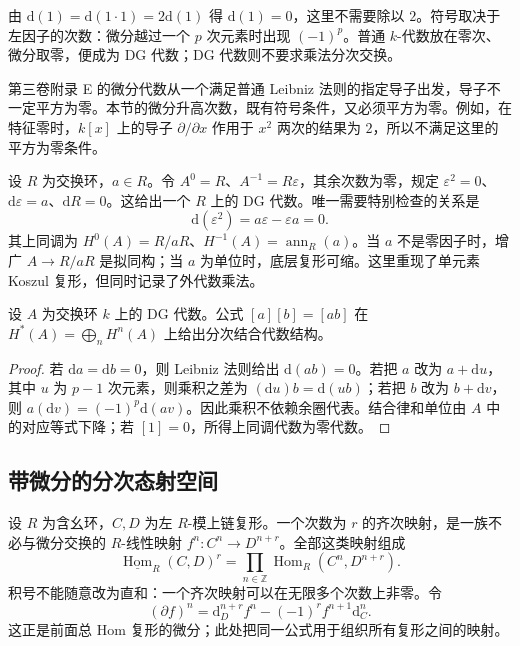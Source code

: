 由 \(\mathrm{d}(1)=\mathrm{d}(1\cdot1)=2\mathrm{d}(1)\) 得 \(\mathrm{d}(1)=0\)，这里不需要除以 \(2\)。符号取决于左因子的次数：微分越过一个 \(p\) 次元素时出现 \((-1)^p\)。普通 \(k\)-代数放在零次、微分取零，便成为 DG 代数；DG 代数则不要求乘法分次交换。

\ProseParagraphBreak
第三卷附录 E 的微分代数从一个满足普通 Leibniz 法则的指定导子出发，导子不一定平方为零。本节的微分升高次数，既有符号条件，又必须平方为零。例如，在特征零时，\(k[x]\) 上的导子 \(\partial/\partial x\) 作用于 \(x^2\) 两次的结果为 \(2\)，所以不满足这里的平方为零条件。

\begin{example}\label{b4:exm:dg-koszul-one-element}
	设 \(R\) 为交换环，\(a\in R\)。令 \(A^0=R\)、\(A^{-1}=R\varepsilon\)，其余次数为零，规定 \(\varepsilon^2=0\)、\(\mathrm{d}\varepsilon=a\)、\(\mathrm{d}R=0\)。这给出一个 \(R\) 上的 DG 代数。唯一需要特别检查的关系是
	\[
		\mathrm{d}(\varepsilon^2)=a\varepsilon-\varepsilon a=0.
	\]
	其上同调为 \(H^0(A)=R/aR\)、\(H^{-1}(A)=\operatorname{ann}_R(a)\)。当 \(a\) 不是零因子时，增广 \(A\to R/aR\) 是拟同构；当 \(a\) 为单位时，底层复形可缩。这里重现了单元素 Koszul 复形，但同时记录了外代数乘法。
\end{example}

\begin{proposition}\label{b4:prop:dg-cohomology-product}
	设 \(A\) 为交换环 \(k\) 上的 DG 代数。公式 \([a][b]=[ab]\) 在 \(H^*(A)=\bigoplus_n H^n(A)\) 上给出分次结合代数结构。
\end{proposition}
\begin{proof}
	若 \(\mathrm{d}a=\mathrm{d}b=0\)，则 Leibniz 法则给出 \(\mathrm{d}(ab)=0\)。若把 \(a\) 改为 \(a+\mathrm{d}u\)，其中 \(u\) 为 \(p-1\) 次元素，则乘积之差为 \((\mathrm{d}u)b=\mathrm{d}(ub)\)；若把 \(b\) 改为 \(b+\mathrm{d}v\)，则 \(a(\mathrm{d}v)=(-1)^p \mathrm{d}(av)\)。因此乘积不依赖余圈代表。结合律和单位由 \(A\) 中的对应等式下降；若 \([1]=0\)，所得上同调代数为零代数。
\end{proof}

\subsection{带微分的分次态射空间}
\label{b4:subsec:2001:02}

设 \(R\) 为含幺环，\(C,D\) 为左 \(R\)-模上链复形。一个次数为 \(r\) 的齐次映射，是一族不必与微分交换的 \(R\)-线性映射 \(f^n:C^n\to D^{n+r}\)。全部这类映射组成
\[
	\underline{\operatorname{Hom}}_R(C,D)^r =\prod_{n\in\mathbb Z}\operatorname{Hom}_R(C^n,D^{n+r}).
\]
积号不能随意改为直和：一个齐次映射可以在无限多个次数上非零。令
\begin{equation}\label{b4:eq:dg-hom-differential}
	(\partial f)^n=\mathrm{d}_D^{n+r}f^n-(-1)^r f^{n+1}\mathrm{d}_C^n.
\end{equation}
这正是前面总 Hom 复形的微分；此处把同一公式用于组织所有复形之间的映射。


